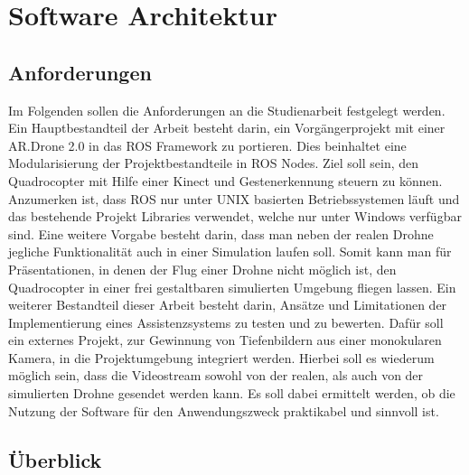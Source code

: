 
\chapter{Software Architektur}
\section{Anforderungen}
\label{sec:Anforderungen} 

Im Folgenden sollen die Anforderungen an die Studienarbeit festgelegt werden. \newline
Ein Hauptbestandteil der Arbeit besteht darin, ein Vorgängerprojekt mit einer AR.Drone 2.0 in das ROS Framework zu portieren.
Dies beinhaltet eine Modularisierung der Projektbestandteile in ROS Nodes. Ziel soll sein, den Quadrocopter mit Hilfe einer Kinect und Gestenerkennung steuern zu können. Anzumerken ist, dass ROS nur unter UNIX basierten Betriebssystemen läuft und das bestehende Projekt Libraries verwendet, welche nur unter Windows verfügbar sind. \newline
Eine weitere Vorgabe besteht darin, dass man neben der realen Drohne jegliche Funktionalität auch in einer Simulation laufen soll. \newline
Somit kann man für Präsentationen, in denen der Flug einer Drohne nicht möglich ist, den Quadrocopter in einer frei gestaltbaren simulierten Umgebung fliegen lassen. \newline
Ein weiterer Bestandteil dieser Arbeit besteht darin, Ansätze und Limitationen der Implementierung eines Assistenzsystems zu testen und zu bewerten. Dafür soll ein externes Projekt, zur Gewinnung von Tiefenbildern aus einer monokularen Kamera, in die Projektumgebung integriert werden. Hierbei soll es wiederum möglich sein, dass die Videostream sowohl von der realen, als auch von der simulierten Drohne gesendet werden kann. \newline
Es soll dabei ermittelt werden, ob die Nutzung der Software für den Anwendungszweck praktikabel und sinnvoll ist.




\section{Überblick}
\label{Überblick}

